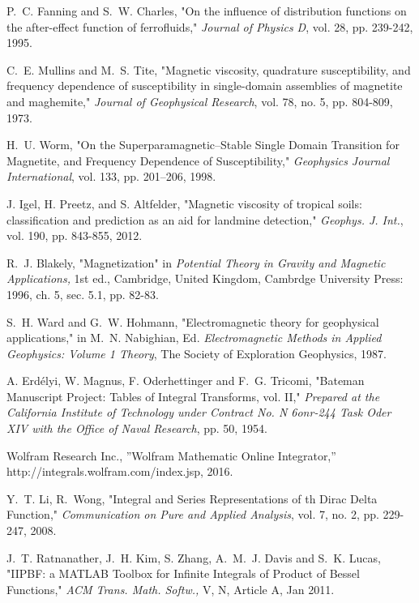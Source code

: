 \documentclass[journal]{IEEEtran}  %
\begin{document}
\begin{thebibliography}{100}
P.~C. Fanning and S.~W. Charles, "On the influence of distribution functions on the after-effect function of ferrofluids," \emph{Journal of Physics D}, vol. 28, pp. 239-242, 1995.

C.~E. Mullins and M.~S. Tite, "Magnetic viscosity, quadrature susceptibility, and frequency dependence of susceptibility in single-domain assemblies of magnetite and maghemite," \emph{Journal of Geophysical Research}, vol. 78, no. 5, pp. 804-809, 1973.

H.~U. Worm, "On the Superparamagnetic–Stable Single Domain Transition for Magnetite, and Frequency Dependence of Susceptibility," \emph{Geophysics Journal International}, vol. 133, pp. 201–206, 1998.

J. Igel, H. Preetz, and S. Altfelder, "Magnetic viscosity of tropical soils: classification and prediction as an aid for landmine detection," \emph{Geophys. J. Int.}, vol. 190, pp. 843-855, 2012.

R.~J. Blakely, "Magnetization" in \emph{Potential Theory in Gravity and Magnetic Applications,} 1st ed., Cambridge, United Kingdom, Cambrdge University Press: 1996, ch. 5, sec. 5.1, pp. 82-83.

S.~H. Ward and G.~W. Hohmann, "Electromagnetic theory for geophysical applications," in M.~N. Nabighian, Ed. \emph{Electromagnetic Methods in Applied Geophysics: Volume 1 Theory}, The Society of Exploration Geophysics, 1987.

A. Erd\'{e}lyi, W. Magnus, F. Oderhettinger and F.~G. Tricomi, "Bateman Manuscript Project: Tables of Integral Transforms, vol. II," \emph{Prepared at the California Institute of Technology under Contract No. N 6onr-244 Task Oder XIV with the Office of Naval Research}, pp. 50, 1954.

Wolfram Research Inc., ”Wolfram Mathematic Online Integrator,” http://integrals.wolfram.com/index.jsp, 2016. 

Y.~T. Li, R.~Wong, "Integral and Series Representations of th Dirac Delta Function," \emph{Communication on Pure and Applied Analysis}, vol. 7, no. 2, pp. 229-247, 2008.

J.~T. Ratnanather, J.~H. Kim, S. Zhang, A.~M.~J. Davis and S.~K. Lucas, "IIPBF: a MATLAB Toolbox for Infinite Integrals of Product of Bessel Functions," \emph{ACM Trans. Math. Softw.,} V, N, Article A, Jan 2011.


\end{thebibliography}
\end{document}
